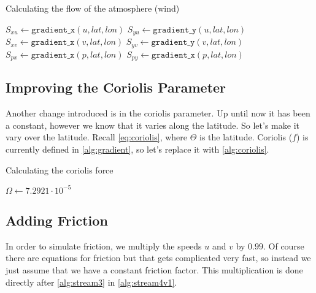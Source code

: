 \begin{algorithm}
    \caption{Calculating the flow of the atmosphere (wind)}
    \label{alg:stream3}
    $S_{xu} \leftarrow \texttt{gradient\_x}(u, lat, lon)$ \;
    $S_{yu} \leftarrow \texttt{gradient\_y}(u, lat, lon)$ \;
    $S_{xv} \leftarrow \texttt{gradient\_x}(v, lat, lon)$ \;
    $S_{yv} \leftarrow \texttt{gradient\_y}(v, lat, lon)$ \;
    $S_{px} \leftarrow \texttt{gradient\_x}(p, lat, lon)$ \;
    $S_{py} \leftarrow \texttt{gradient\_x}(p, lat, lon)$ \;
\end{algorithm}

\subsection{Improving the Coriolis Parameter}
Another change introduced is in the coriolis parameter. Up until now it has been a constant, however we know that it varies along the latitude. So let's make it vary over the latitude. Recall 
\autoref{eq:coriolis}, where $\Theta$ is the latitude. Coriolis ($f$) is currently defined in \autoref{alg:gradient}, so let's replace it with \autoref{alg:coriolis}.

\begin{algorithm}
    \caption{Calculating the coriolis force}
    \label{alg:coriolis}
    \SetAlgoLined
    $\Omega \leftarrow 7.2921 \cdot 10^{-5}$ \;

\end{algorithm}

\subsection{Adding Friction}
In order to simulate friction, we multiply the speeds $u$ and $v$ by $0.99$. Of course there are equations for friction but that gets complicated very fast, so instead we just assume that we
have a constant friction factor. This multiplication is done directly after \autoref{alg:stream3} in \autoref{alg:stream4v1}.


